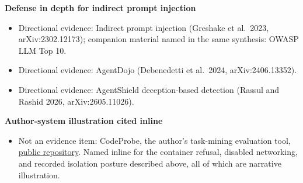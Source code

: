 \textbf{Defense in depth for indirect prompt injection}

\begin{itemize}
\tightlist
\item
  Directional evidence: Indirect prompt injection (Greshake et al.~2023, arXiv:2302.12173); companion material named in the same synthesis: OWASP LLM Top 10.
\item
  Directional evidence: AgentDojo (Debenedetti et al.~2024, arXiv:2406.13352).
\item
  Directional evidence: AgentShield deception-based detection (Rassul and Rashid 2026, arXiv:2605.11026).
\end{itemize}

\textbf{Author-system illustration cited inline}

\begin{itemize}
\tightlist
\item
  Not an evidence item: CodeProbe, the author's task-mining evaluation tool, \href{https://github.com/sjarmak/codeprobe}{public repository}. Named inline for the container refusal, disabled networking, and recorded isolation posture described above, all of which are narrative illustration.
\end{itemize}

